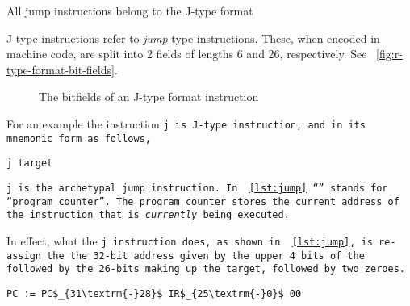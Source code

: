 All jump instructions belong to the J-type format

J-type instructions refer to \emph{jump} type instructions. These,
when encoded in machine code, are split into 2 fields of lengths 6 and
26, respectively. See ~\autoref{fig:r-type-format-bit-fields}.

\begin{figure}[H]
  \makebox[\textwidth][c]{
  }
  \caption{The bitfields of an J-type format instruction}
  \label{fig:j-type-format-bit-fields}
\end{figure}

For an example the instruction \tt{j} is J-type instruction, and in
its mnemonic form as follows,

\begin{lstlisting}[style=mips_lst]
j target
\end{lstlisting}

\tt{j} is the archetypal jump instruction. In ~\autoref{lst:jump}
``\PC{}'' stands for ``program counter''. The program counter stores
the current address of the instruction that is \emph{currently}
being executed.

In effect, what the \tt{j} instruction does, as shown in
~\autoref{lst:jump}, is re-assign the \PC{} the 32-bit address given
by the upper 4 bits of the \PC{} followed by the 26-bits making up the
target, followed by two zeroes.

\begin{lstlisting}[style=semantics_lst, label={lst:jump}]
PC := PC$_{31\textrm{-}28}$ IR$_{25\textrm{-}0}$ 00
\end{lstlisting}

